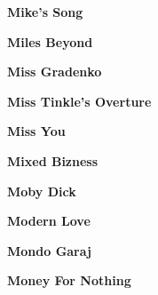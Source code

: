 \newline
\vspace{10pt} 
\begin{center}\textbf{Mike's Song}\end{center}
\newline
\vspace{10pt} 
\begin{center}\textbf{Miles Beyond}\end{center}
\newline
\vspace{10pt} 
\begin{center}\textbf{Miss Gradenko}\end{center}
\newline
\vspace{10pt} 
\begin{center}\textbf{Miss Tinkle's Overture}\end{center}
\newline
\vspace{10pt} 
\begin{center}\textbf{Miss You}\end{center}
\newline
\vspace{10pt} 
\begin{center}\textbf{Mixed Bizness}\end{center}
\newline
\vspace{10pt} 
\begin{center}\textbf{Moby Dick}\end{center}
\newline
\vspace{10pt} 
\begin{center}\textbf{Modern Love}\end{center}
\newline
\vspace{10pt} 
\begin{center}\textbf{Mondo Garaj}\end{center}
\newline
\vspace{10pt} 
\begin{center}\textbf{Money For Nothing}\end{center}
